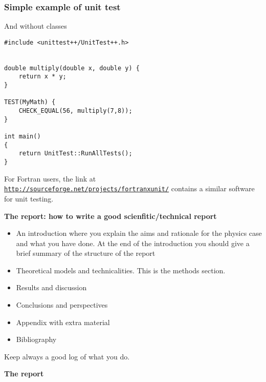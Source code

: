 \documentclass{beamer}
\newenvironment{block_mdfboxadmon}[1][]{\begin{block}{#1}}{\end{block}}
\begin{document}
\begin{frame}
\frametitle{Simple example of unit test}

\begin{block_mdfboxadmon}[]
And without classes
\begin{verbatim}
#include <unittest++/UnitTest++.h>


double multiply(double x, double y) {
    return x * y;
}

TEST(MyMath) {
    CHECK_EQUAL(56, multiply(7,8));
}

int main()
{
    return UnitTest::RunAllTests();
} 
\end{verbatim}
For Fortran users, the link at \href{{http://sourceforge.net/projects/fortranxunit/}}{\nolinkurl{http://sourceforge.net/projects/fortranxunit/}} contains a similar
software for unit testing.
\end{block_mdfboxadmon}





\noindent\textbf{\large The report: how to write a good scienfitic/technical report}

\begin{block_mdfboxadmon}
\begin{itemize}
 \item An introduction where you explain the aims and rationale for the physics case and  what you have done. At the end of the introduction you should give a brief summary of the structure of the report

 \item Theoretical models and technicalities. This is the methods section.

 \item Results and discussion

 \item Conclusions and perspectives

 \item Appendix with extra material

 \item Bibliography
\end{itemize}

\noindent
Keep always a good log of what you do.
\end{block_mdfboxadmon}




\noindent\textbf{\large The report}


\end{frame}
\end{document}

